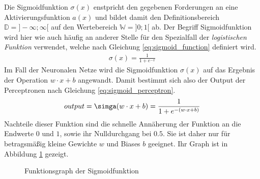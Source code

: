 \documentclass[../main.tex]{subfiles}
\begin{document}
Die Sigmoidfunktion $\sigma(x)$ enstpricht den gegebenen Forderungen an eine Aktivierungsfunktion $a(x)$ und bildet damit den Definitionsbereich $\mathbb{D} = ]-\infty; \infty [$ auf den Wertebereich $\mathbb{W} = ]0;1[$ ab. Der Begriff Sigmoidfunktion wird hier wie auch häufig an anderer Stelle für den Spezialfall der \emph{logistischen Funktion} verwendet, welche nach Gleichung \ref{eq:sigmoid_function} definiert wird.
\begin{align}
	\sigma(x) = \frac{1}{1 + e^{-x}} \label{eq:sigmoid_function}
\end{align}
Im Fall der Neuronalen Netze wird die Sigmoidfunktion $\sigma(x)$ auf das Ergebnis der Operation $w\cdot x + b$ angewandt. Damit bestimmt sich also der Output der Perceptronen nach Gleichung \ref{eq:sigmoid_perceptron}. 
\begin{align} \label{eq:sigmoid_perceptron}
	output = \simga(w\cdot x + b) = \frac{1}{1 + e^{-(w\cdot x + b)}} 
\end{align}
Nachteile dieser Funktion sind die schnelle Annäherung der Funktion an die Endwerte $0$ und $1$, sowie ihr Nulldurchgang bei $0.5$. Sie ist daher nur für betragsmäßig kleine Gewichte $w$ und Biases $b$ geeignet. Ihr Graph ist in Abbildung \ref{fig:sigmoid} gezeigt.
\begin{figure}
	\centering
	\caption{Funktionsgraph der Sigmoidfunktion}\label{fig:sigmoid}
\end{figure}
\end{document}
